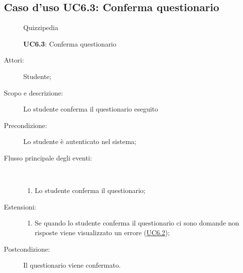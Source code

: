 \subsection{Caso d'uso UC6.3: Conferma questionario}
	\begin{figure}[H]
		\centering
		\begin{resizedtikzpicture}{\textwidth}
		\begin{umlsystem}[x=0, fill=lightgray!20]{Quizzipedia}
		\end{umlsystem}
		\end{resizedtikzpicture}
		\caption{\textbf{UC6.3}: Conferma questionario}
		\label{UC6.3}
	\end{figure}
\begin{description}
\item[Attori:] Studente;
\item[Scopo e descrizione:] Lo studente conferma il questionario eseguito
      \item[Precondizione:] Lo studente è autenticato nel sistema;

        \item[Flusso principale degli eventi:] \ 
 \begin{enumerate}
          \item Lo studente conferma il questionario;

      \end{enumerate}
    \item[Estensioni:]
      \begin{enumerate}
          \item Se quando lo studente conferma il questionario ci sono domande non risposte viene visualizzato un errore (\hyperlink{UC6.2}{UC6.2});

      \end{enumerate}
    \item[Postcondizione:] Il questionario viene confermato.
  \end{description}
\hypertarget{UC6.4}{}
